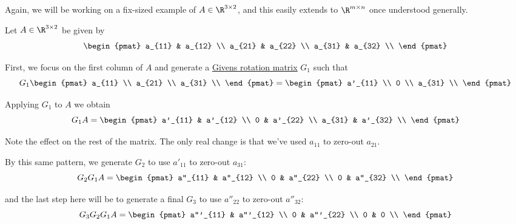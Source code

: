 \label{e51b996}

Again, we will be working on a fix-sized example of $A\in\R^{3\times2}$, and
this easily extends to $\R^{m\times n}$ once understood generally.

Let $A\in\R^{3\times2}$ be given by
$$
  \begin{pmat}
    a_{11} & a_{12} \\
    a_{21} & a_{22} \\
    a_{31} & a_{32} \\
  \end{pmat}
$$

First, we focus on the first column of $A$ and generate a \href{b80ae20}{Givens
rotation matrix} $G_1$ such that
$$
  G_1\begin{pmat}
    a_{11} \\
    a_{21} \\
    a_{31} \\
  \end{pmat}=\begin{pmat}
    a'_{11} \\
    0       \\
    a_{31}  \\
  \end{pmat}
$$

Applying $G_1$ to $A$ we obtain
$$
  G_1A=\begin{pmat}
    a'_{11} & a'_{12} \\
    0       & a'_{22} \\
    a_{31}  & a'_{32} \\
  \end{pmat}
$$

Note the effect on the rest of the matrix. The only real change is that we've
used $a_{11}$ to zero-out $a_{21}$.

By this same pattern, we generate $G_2$ to use $a'_{11}$ to zero-out $a_{31}$:
$$
  G_2G_1A=\begin{pmat}
    a''_{11} & a''_{12} \\
    0        & a''_{22} \\
    0        & a''_{32} \\
  \end{pmat}
$$

and the last step here will be to generate a final $G_3$ to use $a''_{22}$ to
zero-out $a''_{32}$:
$$
  G_3G_2G_1A=\begin{pmat}
    a'''_{11} & a'''_{12} \\
    0         & a'''_{22} \\
    0         & 0         \\
  \end{pmat}
$$

